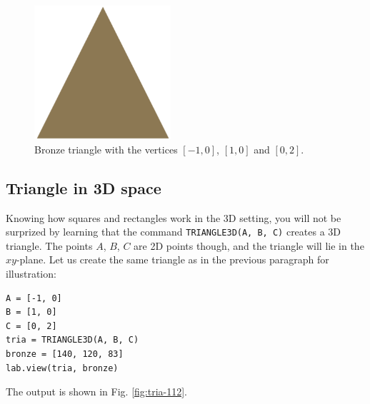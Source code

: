 \begin{figure}[!ht]
\begin{center}
\includegraphics[width=0.45\textwidth]{img/tria-111.png}
\end{center}
\vspace{-4mm}
\caption{Bronze triangle with the vertices $[-1, 0]$, $[1, 0]$ and $[0, 2]$.}
\label{fig:tria-111}
\end{figure}
\noindent

\subsection{Triangle in 3D space}

Knowing how squares and rectangles work in the 3D setting, you will
not be surprized by learning that the command {\tt TRIANGLE3D(A, B, C)}
creates a 3D triangle. The points $A$, $B$, $C$ are 2D points though, 
and the triangle will lie in the $xy$-plane. Let us create the 
same triangle as in the previous paragraph for illustration:\\

\begin{bbox}
\begin{verbatim}
A = [-1, 0] 
B = [1, 0] 
C = [0, 2] 
tria = TRIANGLE3D(A, B, C)
bronze = [140, 120, 83]
lab.view(tria, bronze)
\end{verbatim}
\end{bbox}
\vspace{6mm}

\noindent
The output is shown in Fig. \ref{fig:tria-112}.

